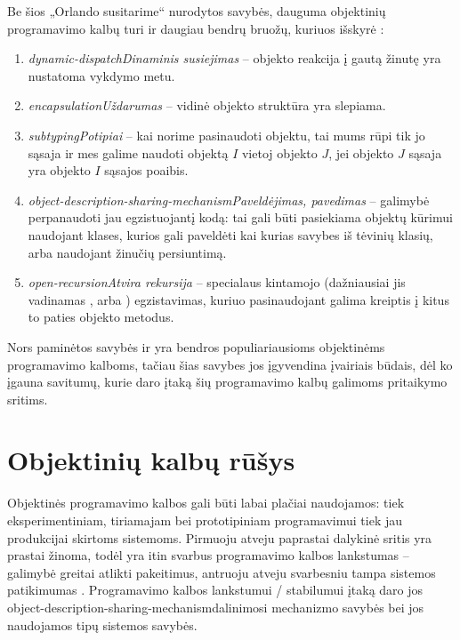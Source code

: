 Be šios „Orlando susitarime“ nurodytos savybės, dauguma
objektinių programavimo kalbų turi ir daugiau bendrų bruožų,
kuriuos išskyrė \cite[225-227]{types-and-programming-languages}:
\begin{enumerate}
  \item \emph{\gls{dynamic-dispatch}{Dinaminis susiejimas}} –
    objekto reakcija į gautą žinutę yra nustatoma vykdymo metu.
  \item \emph{\gls{encapsulation}{Uždarumas}} – vidinė objekto
    struktūra yra slepiama.
  \item \emph{\gls{subtyping}{Potipiai}} – kai norime pasinaudoti objektu, 
    tai mums rūpi tik jo sąsaja ir mes galime naudoti objektą $I$ vietoj
    objekto $J$, jei objekto $J$ sąsaja yra objekto $I$ sąsajos poaibis.
  \item \emph{\gls{object-description-sharing-mechanism}{Paveldėjimas,
    pavedimas}} – galimybė perpanaudoti jau egzistuojantį kodą: tai
    gali būti pasiekiama objektų kūrimui naudojant klases, kurios
    gali paveldėti kai kurias savybes iš tėvinių klasių, arba
    naudojant žinučių persiuntimą.
  \item \emph{\gls{open-recursion}{Atvira rekursija}} – specialaus
    kintamojo (dažniausiai jis vadinamas , arba
    ) egzistavimas, kuriuo pasinaudojant galima kreiptis
    į kitus to paties objekto metodus.
\end{enumerate}
Nors paminėtos savybės ir yra bendros populiariausioms objektinėms
programavimo kalboms, tačiau šias savybes jos įgyvendina įvairiais
būdais, dėl ko įgauna savitumų, kurie daro įtaką šių
programavimo kalbų galimoms pritaikymo sritims.

\section{Objektinių kalbų rūšys}


Objektinės programavimo kalbos gali būti labai plačiai naudojamos:
tiek eksperimentiniam, tiriamajam bei prototipiniam programavimui tiek
jau produkcijai skirtoms sistemoms. Pirmuoju atveju paprastai dalykinė
sritis yra prastai žinoma, todėl yra itin svarbus programavimo kalbos
lankstumas – galimybė greitai atlikti pakeitimus, antruoju atveju
svarbesniu tampa sistemos patikimumas
\cite{Lieberman:1987:TO:62139.62144}. Programavimo kalbos
lankstumui / stabilumui įtaką daro jos 
\gls{object-description-sharing-mechanism}{dalinimosi mechanizmo}
savybės \cite{Lieberman:1987:TO:62139.62144} bei jos naudojamos
tipų sistemos savybės.

